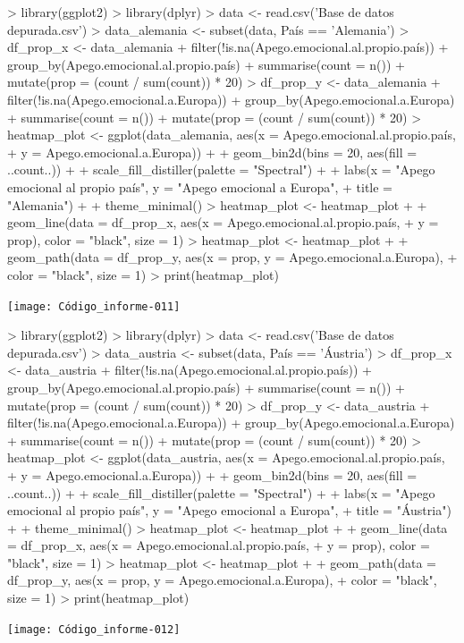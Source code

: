 \documentclass{article}
\begin{document}
\newpage
\begin{Schunk}
\begin{Sinput}
> library(ggplot2)
> library(dplyr)
> data <- read.csv('Base de datos depurada.csv')
> data_alemania <- subset(data, País == 'Alemania')
> df_prop_x <- data_alemania %
+   filter(!is.na(Apego.emocional.al.propio.país)) %
+   group_by(Apego.emocional.al.propio.país) %
+   summarise(count = n()) %
+   mutate(prop = (count / sum(count)) * 20)
> df_prop_y <- data_alemania %
+   filter(!is.na(Apego.emocional.a.Europa)) %
+   group_by(Apego.emocional.a.Europa) %
+   summarise(count = n()) %
+   mutate(prop = (count / sum(count)) * 20)
> heatmap_plot <- ggplot(data_alemania, aes(x = Apego.emocional.al.propio.país,
+                                  y = Apego.emocional.a.Europa)) +
+   geom_bin2d(bins = 20, aes(fill = ..count..)) +
+   scale_fill_distiller(palette = "Spectral") +
+   labs(x = "Apego emocional al propio país", y = "Apego emocional a Europa",
+        title = "Alemania") +
+   theme_minimal()
> heatmap_plot <- heatmap_plot +
+   geom_line(data = df_prop_x, aes(x = Apego.emocional.al.propio.país,
+                                   y = prop), color = "black", size = 1)
> heatmap_plot <- heatmap_plot +
+   geom_path(data = df_prop_y, aes(x = prop, y = Apego.emocional.a.Europa),
+             color = "black", size = 1)
> print(heatmap_plot)
\end{Sinput}
\end{Schunk}
\texttt{[image: Código\_informe-011]}

\newpage
\begin{Schunk}
\begin{Sinput}
> library(ggplot2)
> library(dplyr)
> data <- read.csv('Base de datos depurada.csv')
> data_austria <- subset(data, País == 'Áustria')
> df_prop_x <- data_austria %
+   filter(!is.na(Apego.emocional.al.propio.país)) %
+   group_by(Apego.emocional.al.propio.país) %
+   summarise(count = n()) %
+   mutate(prop = (count / sum(count)) * 20)
> df_prop_y <- data_austria %
+   filter(!is.na(Apego.emocional.a.Europa)) %
+   group_by(Apego.emocional.a.Europa) %
+   summarise(count = n()) %
+   mutate(prop = (count / sum(count)) * 20)
> heatmap_plot <- ggplot(data_austria, aes(x = Apego.emocional.al.propio.país,
+                                  y = Apego.emocional.a.Europa)) +
+   geom_bin2d(bins = 20, aes(fill = ..count..)) +
+   scale_fill_distiller(palette = "Spectral") +
+   labs(x = "Apego emocional al propio país", y = "Apego emocional a Europa",
+        title = "Áustria") +
+   theme_minimal()
> heatmap_plot <- heatmap_plot +
+   geom_line(data = df_prop_x, aes(x = Apego.emocional.al.propio.país,
+                                   y = prop), color = "black", size = 1)
> heatmap_plot <- heatmap_plot +
+   geom_path(data = df_prop_y, aes(x = prop, y = Apego.emocional.a.Europa),
+             color = "black", size = 1)
> print(heatmap_plot)
\end{Sinput}
\end{Schunk}
\texttt{[image: Código\_informe-012]}
\end{document}
